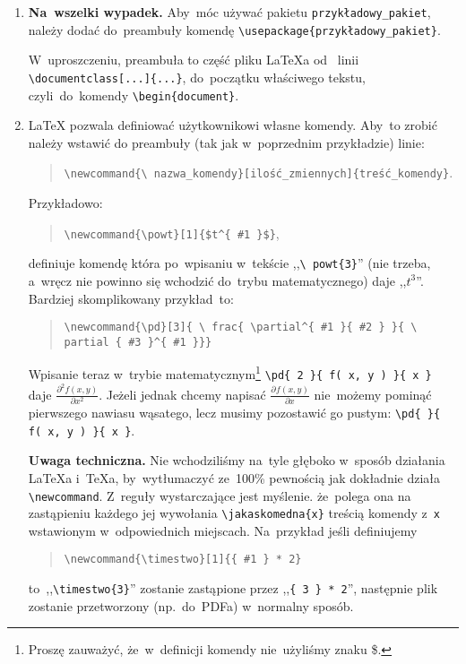 \documentclass[a4paper,11pt]{article}
\newcommand{\tbs}{\textbackslash}  %
\newcommand{\tb}{\textbf}
\newcommand{\powt}[1]{$t^{ #1 }$}
\newcommand{\pd}[3]{ \frac{ \partial^{ #1 } { #2 } }
  { \partial { #3 }^{ #1 } } }
\begin{document}
\begin{enumerate}
\item \tb{Na~wszelki wypadek.} Aby~móc używać pakietu
  \texttt{przykładowy\_pakiet}, należy dodać do~preambuły komendę
  \texttt{\tbs usepackage\{przykładowy\_pakiet\}}.

  W~uproszczeniu, preambuła to część pliku \LaTeX a od~ linii
  \texttt{\tbs documentclass[...]\{...\}}, do~początku właściwego
  tekstu, czyli~do~komendy \texttt{\tbs begin\{document\}}.
\item \LaTeX{} pozwala definiować użytkownikowi własne komendy. Aby~to
  zrobić należy wstawić do preambuły (tak jak w~poprzednim
  przykładzie) linie:
  \begin{quote}
    \texttt{\tbs newcommand\{\tbs
      nazwa\_komendy\}[ilość\_zmiennych]\{treść\_komendy\}}.
  \end{quote}
  Przykładowo:
  \begin{quote}
    \texttt{\tbs newcommand\{\tbs powt\}}\verb+[1]{$t^{ #1 }$}+,
  \end{quote}
  definiuje komendę która po~wpisaniu w~tekście ,,\texttt{\tbs
    powt\{3\}}'' (nie trzeba, a~wręcz nie powinno się wchodzić
  do~trybu matematycznego) daje ,,\powt{3}''. Bardziej skomplikowany
  przykład~to:
  \begin{quote}
    \texttt{\tbs newcommand\{\tbs pd\}}\verb+[3]+\texttt{\{ \tbs
      frac\{ \tbs partial\^{}\{ \#1 \}\{ \#2 \} \}}\texttt{\{ \tbs
      partial \{ \#3 \}\^{}\{ \#1 \}\}\}}
  \end{quote}
  Wpisanie teraz w~trybie matematycznym\footnote{Proszę zauważyć,
    że~w~definicji komendy nie~użyliśmy znaku \$.} \texttt{\tbs pd\{ 2
    \}\{ f( x, y ) \}\{ x \}} daje $\pd{ 2 }{ f( x, y ) }{ x }$.
  Jeżeli jednak chcemy napisać $\pd{}{ f( x, y ) }{ x }$ nie~możemy
  pominąć pierwszego nawiasu wąsatego, lecz musimy pozostawić go
  pustym: \texttt{\tbs pd\{ \}\{ f( x, y ) \}\{ x \}}.

  \textbf{Uwaga techniczna.} Nie wchodziliśmy na~tyle głęboko w~sposób
  działania \LaTeX a i~\TeX a, by~wytłumaczyć ze~100\% pewnością jak
  dokładnie działa \texttt{\tbs newcommand}. Z~reguły wystarczające
  jest myślenie. że~polega ona na zastąpieniu każdego jej wywołania
  \texttt{\tbs jakaskomedna\{x\}} treścią komendy z~\texttt{x}
  wstawionym w~odpowiednich miejscach. Na~przykład jeśli definiujemy
  \begin{quote}
    \texttt{\tbs newcommand\{\tbs timestwo\}[1]\{\{ \#1 \} * 2\}}
  \end{quote}
  to~,,\texttt{\tbs timestwo\{3\}}'' zostanie zastąpione przez
  ,,\texttt{\{ 3 \} * 2}'', następnie plik zostanie przetworzony
  (np.~do~PDFa) w~normalny sposób.


\end{enumerate}
\end{document}
